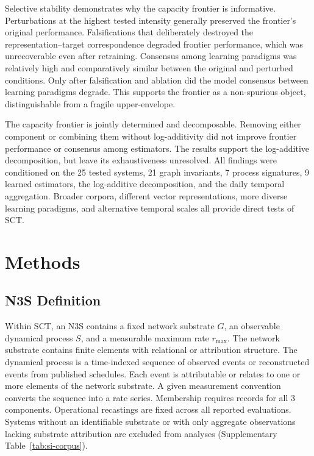 \documentclass{article}
\begin{document}
Selective stability demonstrates why the capacity frontier is informative. Perturbations at the highest tested intensity generally preserved the frontier's original performance. Falsifications that deliberately destroyed the representation–target correspondence degraded frontier performance, which was unrecoverable even after retraining. Consensus among learning paradigms was relatively high and comparatively similar between the original and perturbed conditions. Only after falsification and ablation did the model consensus between learning paradigms degrade. This supports the frontier as a non-spurious object, distinguishable from a fragile upper-envelope.

The capacity frontier is jointly determined and decomposable. Removing either component or combining them without log-additivity did not improve frontier performance or consensus among estimators. The results support the log-additive decomposition, but leave its exhaustiveness unresolved. All findings were conditioned on the 25 tested systems, 21 graph invariants, 7 process signatures, 9 learned estimators, the log-additive decomposition, and the daily temporal aggregation. Broader corpora, different vector representations, more diverse learning paradigms, and alternative temporal scales all provide direct tests of SCT.

\section*{Methods}
\label{sec:methods}

\subsection*{N3S Definition}
Within SCT, an N3S contains a fixed network substrate $G$, an observable dynamical process $S$, and a measurable maximum rate $r_{\max}$. The network substrate contains finite elements with relational or attribution structure. The dynamical process is a time-indexed sequence of observed events or reconstructed events from published schedules. Each event is attributable or relates to one or more elements of the network substrate. A given measurement convention converts the sequence into a rate series. Membership requires records for all 3 components. Operational recastings are fixed across all reported evaluations. Systems without an identifiable substrate or with only aggregate observations lacking substrate attribution are excluded from analyses (Supplementary Table~\ref{tab:si-corpus}).
\end{document}
